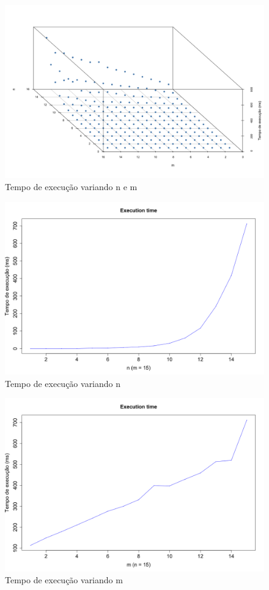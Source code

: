 \documentclass{report}
\begin{document}
\begin{figure}
  \includegraphics[width=\linewidth]{execution_time.png}
  \caption{Tempo de execução variando n e m}
  \label{fig:execution_time}
\end{figure}

\begin{figure}
  \includegraphics[width=\linewidth]{n.png}
  \caption{Tempo de execução variando n}
  \label{fig:n}
\end{figure}

\begin{figure}
  \includegraphics[width=\linewidth]{m.png}
  \caption{Tempo de execução variando m}
  \label{fig:m}
\end{figure}
\end{document}
